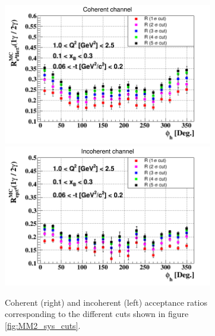 \begin{figure}[h!]
   \includegraphics[height=6.2cm]{fig/e4Hegamma_e4Hepi0_Phi_2.png}
   \includegraphics[height=6.2cm]{fig/epgamma_eppi0_Phi.png}
   \caption{Coherent (right) and incoherent (left) acceptance ratios 
corresponding to the different cuts shown in figure \ref{fig:MM2_sys_cuts}. }
\label{fig:R_sys_plot}
\end{figure}


